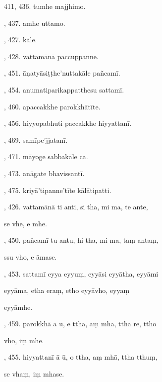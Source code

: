 411, 436. tumhe majjhimo.\hfill \pageref{sut:411}\par {}, 437. amhe uttamo.\hfill \pageref{sut:412}\par {}, 427. kāle.\hfill \pageref{sut:413}\par {}, 428. vattamānā paccuppanne.\hfill \pageref{sut:414}\par {}, 451. āṇatyāsiṭṭhe’nuttakāle pañcamī.\hfill \pageref{sut:415}\par {}, 454. anumatiparikappatthesu sattamī.\hfill \pageref{sut:416}\par {}, 460. apaccakkhe parokkhātīte.\hfill \pageref{sut:417}\par {}, 456. hiyyopabhuti paccakkhe hiyyattanī.\hfill \pageref{sut:418}\par {}, 469. samīpe’jjatanī.\hfill \pageref{sut:419}\par {}, 471. māyoge sabbakāle ca.\hfill \pageref{sut:420}\par {}, 473. anāgate bhavissantī.\hfill \pageref{sut:421}\par {}, 475. kriyā’tipanne’tīte kālātipatti.\hfill \pageref{sut:422}\par {}, 426. vattamānā ti anti, si tha, mi ma, te ante,\par \noindent
\hspace{15mm} se vhe, e mhe.\hfill \pageref{sut:423}\par {}, 450. pañcamī tu antu, hi tha, mi ma, taṃ antaṃ,\par \noindent
\hspace{15mm} ssu vho, e āmase.\hfill \pageref{sut:424}\par {}, 453. sattamī eyya eyyuṃ, eyyāsi eyyātha, eyyāmi\par \noindent
\hspace{15mm} eyyāma, etha eraṃ, etho eyyāvho, eyyaṃ\par \noindent
\hspace{15mm} eyyāmhe.\hfill \pageref{sut:425}\par {}, 459. parokkhā a u, e ttha, aṃ mha, ttha re, ttho\par \noindent
\hspace{15mm} vho, iṃ mhe.\hfill \pageref{sut:426}\par {}, 455. hiyyattanī ā ū, o ttha, aṃ mhā, ttha tthuṃ,\par \noindent
\hspace{15mm} se vhaṃ, iṃ mhase.\hfill \pageref{sut:427}\par \noindent
